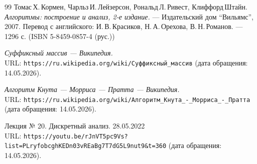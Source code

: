 \begin{thebibliography}{99}
Томас\,Х.\,Кормен, Чарльз\,И.\,Лейзерсон, Рональд\,Л.\,Ривест, Клиффорд\,Штайн.
{\itshape Алгоритмы: построение и анализ, 2-е издание.} --- Издательский дом \enquote{Вильямс}, 2007. Перевод с английского: И.\,В.\,Красиков, Н.\,А.\,Орехова, В.\,Н.\,Романов. --- 1296 с. (ISBN 5-8459-0857-4 (рус.))

{\itshape Суффиксный массив — Википедия.} \\URL: \texttt{https://ru.wikipedia.org/wiki/Суффиксный\_массив} (дата обращения: 14.05.2026).

{\itshape Алгоритм Кнута — Морриса — Пратта — Википедия.} \\URL: \texttt{https://ru.wikipedia.org/wiki/Алгоритм\_Кнута\_-\_Морриса\_-\_Пратта} (дата обращения: 14.05.2026).

Лекция № 20. Дискретный анализ. 28.05.2022 \\URL: \texttt{https://youtu.be/rJnVT5pc9Vs?list=PLryfobcghKEDn03vREaBg7T7dG5L9nut9\&t=360} (дата обращения: 14.05.2026).
\end{thebibliography}
\pagebreak